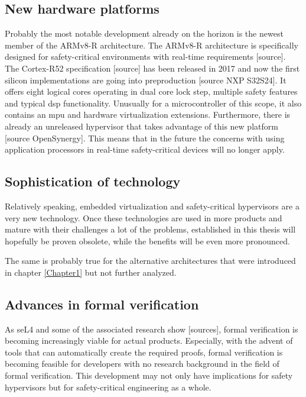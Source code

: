 \subsection{New hardware platforms}
Probably the most notable development already on the horizon is the newest member of the ARMv8-R architecture. The ARMv8-R architecture is specifically designed for safety-critical environments with real-time requirements [source]. %
The Cortex-R52 specification [source] has been released in 2017 and now the first silicon implementations are going into preproduction [source NXP S32S24]. It offers eight logical cores operating in dual core lock step, multiple safety features and typical \acrshort{dsp} functionality. Unusually for a microcontroller of this scope, it also contains an \acrshort{mpu} and hardware virtualization extensions. Furthermore, there is already an unreleased hypervisor that takes advantage of this new platform [source OpenSynergy]. This means that in the future the concerns with using application processors in real-time safety-critical devices will no longer apply.

\subsection{Sophistication of technology}
Relatively speaking, embedded virtualization and safety-critical hypervisors are a very new technology. Once these technologies are used in more products and mature with their challenges a lot of the problems, established in this thesis will hopefully be proven obsolete, while the benefits will be even more pronounced. 

The same is probably true for the alternative architectures that were introduced in chapter \ref{Chapter1} but not further analyzed.
\subsection{Advances in formal verification}
As seL4 and some of the associated research show [sources], formal verification is becoming increasingly viable for actual products. Especially, with the advent of tools that can automatically create the required proofs, formal verification is becoming feasible for developers with no research background in the field of formal verification. This development may not only have implications for safety hypervisors but for safety-critical engineering as a whole.

